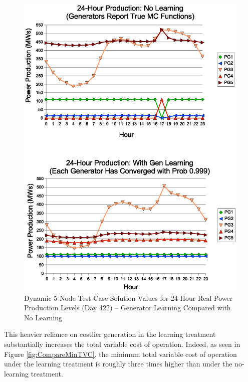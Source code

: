 \documentclass[12pt]{article}
\begin{document}
\begin{figure}
	\centering
		\includegraphics[totalheight = 20cm]{AMES.Results.Prods.eps}
	\caption{Dynamic 5-Node Test Case Solution Values for 24-Hour Real Power Production Levels (Day 422) -- Generator Learning Compared with No Learning}
	\label{fig:Prods}
\end{figure} 


This heavier reliance on costlier generation in the learning treatment substantially increases the total variable cost of operation.  Indeed, as seen in Figure \ref{fig:CompareMinTVC}, the minimum total variable cost of operation under the learning treatment is roughly three times higher than under the no-learning treatment.
\end{document}
